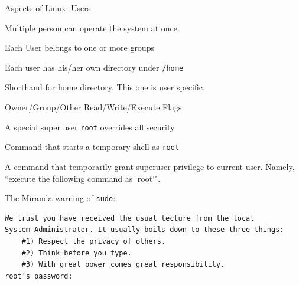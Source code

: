 \begin{frame}[fragile]{Aspects of Linux: Users}
\vspace{-0.12in}
\begin{description}[Permission]
	\small
	\item[MultiUser] Multiple person can operate the system at once.
	\item[Group] Each User belongs to one or more groups
	\item[Home Dir] Each user has his/her own directory under \texttt{/home}
	\item[$\sim$/] Shorthand for home directory. This one is user specific.
	\item[Premission] Owner/Group/Other Read/Write/Execute Flags
	\item[root] A special super user \texttt{root} overrides all security 
	\item[su] Command that starts a temporary shell as \texttt{root}
	\item[sudo] A command that temporarily grant superuser privilege to current user. Namely, ``execute the following command as `root`". 
\end{description}
\small{The Miranda warning of \texttt{sudo}:}
\begin{verbatim}
We trust you have received the usual lecture from the local 
System Administrator. It usually boils down to these three things:
    #1) Respect the privacy of others.
    #2) Think before you type.
    #3) With great power comes great responsibility.
root's password:
\end{verbatim}
\end{frame}

